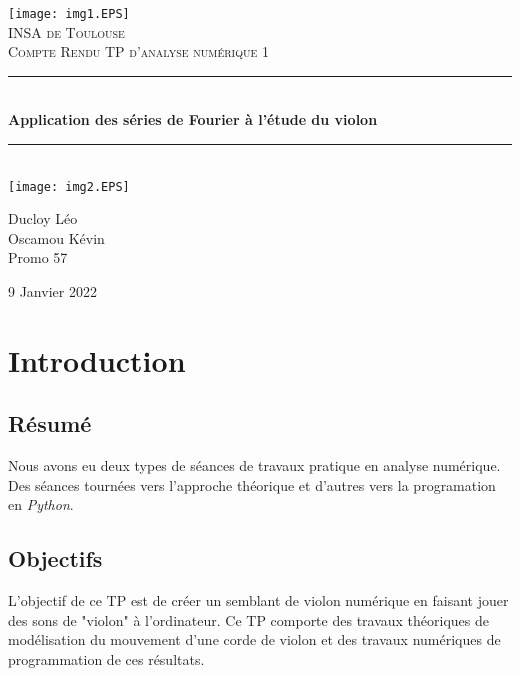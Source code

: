 \documentclass[12pt]{article}
\newcommand{\HRule}{\rule{\linewidth}{0.5mm}}
\begin{document}
\begin{titlepage}
  \begin{sffamily}
  \begin{center}

    \texttt{[image: img1.EPS]}~\\[1.5cm]

    \textsc{\LARGE INSA de Toulouse}\\[2cm]

    \textsc{\Large Compte Rendu TP d'analyse numérique 1}\\[1.5cm]

    \HRule \\[0.4cm]
    { \huge \bfseries Application des séries de Fourier à l’étude du violon\\[0.4cm] }

    \HRule \\[2cm]
    \texttt{[image: img2.EPS]}\\[4cm]

      \begin{flushleft} \large
        Ducloy Léo\\
        Oscamou Kévin\\
        Promo 57\\
      \end{flushleft}

    \vfill

    {\large 9 Janvier 2022}

  \end{center}
  \end{sffamily}
\end{titlepage}

\tableofcontents
\newpage

\section{Introduction}
\subsection{Résumé}
Nous avons eu deux types de séances de travaux pratique en analyse numérique. Des séances tournées vers l'approche théorique et d'autres vers la programation en \textit{Python}.
\subsection{Objectifs}
L’objectif de ce TP est de créer un semblant de violon numérique en faisant jouer des sons de
"violon" à l’ordinateur. Ce TP comporte des travaux théoriques de modélisation du mouvement
d’une corde de violon et des travaux numériques de programmation de ces résultats.
\end{document}
